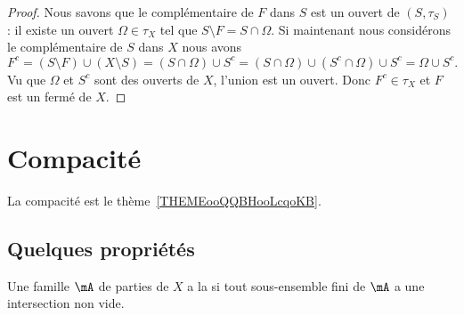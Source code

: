 \begin{proof}
    Nous savons que le complémentaire de \( F\) dans \( S\) est un ouvert de \( (S,\tau_S)\) : il existe un ouvert \( \Omega\in \tau_X\) tel que \( S\setminus F=S\cap \Omega\). Si maintenant nous considérons le complémentaire de \( S\) dans \( X\) nous avons
    \begin{equation}
        F^c=(S\setminus F)\cup (X\setminus S)=(S\cap \Omega)\cup S^c=(S\cap \Omega)\cup(S^c\cap \Omega)\cup S^c=\Omega\cup S^c.
    \end{equation}
    Vu que \( \Omega\) et \( S^c\) sont des ouverts de \( X\), l'union est un ouvert. Donc \( F^c\in \tau_X\) et \( F\) est un fermé de \( X\).
\end{proof}

\section{Compacité}

La compacité est le thème~\ref{THEMEooQQBHooLcqoKB}.

\subsection{Quelques propriétés}

\begin{definition}
    Une famille \( \mA\) de parties de \( X\) a la  si tout sous-ensemble fini de \( \mA\) a une intersection non vide.
\end{definition}

